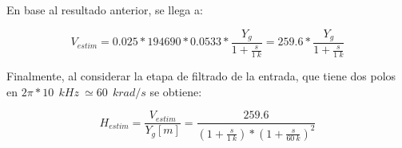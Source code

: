 En base al resultado anterior, se llega a:



\begin{equation}
	V_{estim}=0.025*194690*0.0533 * \frac{Y_{g}}{1 + \frac{s}{1\:k}}=259.6*\frac{Y_{g}}{1 + \frac{s}{1\:k}}	
\end{equation}

Finalmente, al considerar la etapa de filtrado de la entrada, que tiene dos polos en $2\pi *10\: \:{kHz}\ \simeq 60\: \:{krad/s}$ se obtiene:

\begin{equation} \label{eq_TLC_deriv_7}
	H_{estim}=\frac{V_{estim}}{Y_{g}[m]}=\frac{259.6}{(1+\frac{s}{1\:k})*{(1+\frac{s}{60\: k})}^2}
\end{equation}

